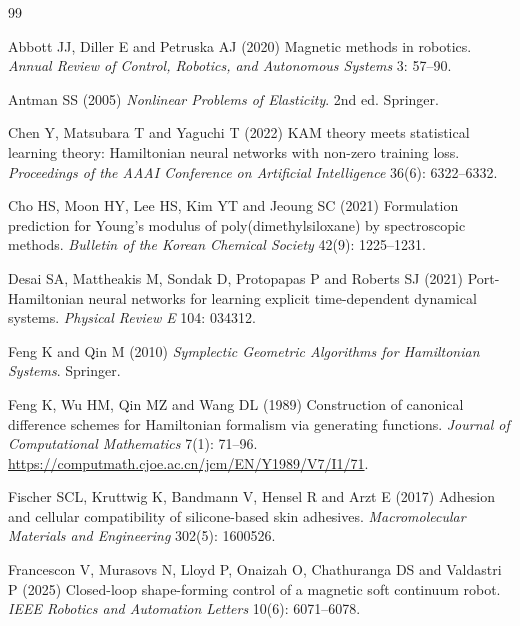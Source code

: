 \begin{thebibliography}{99}

Abbott JJ, Diller E and Petruska AJ (2020) Magnetic methods in robotics.
\textit{Annual Review of Control, Robotics, and Autonomous Systems} 3: 57--90.

Antman SS (2005) \textit{Nonlinear Problems of Elasticity}. 2nd ed. Springer.

Chen Y, Matsubara T and Yaguchi T (2022) KAM theory meets statistical learning theory:
Hamiltonian neural networks with non-zero training loss.
\textit{Proceedings of the AAAI Conference on Artificial Intelligence} 36(6): 6322--6332.

Cho HS, Moon HY, Lee HS, Kim YT and Jeoung SC (2021) Formulation prediction for Young's modulus of poly(dimethylsiloxane) by spectroscopic methods.
\textit{Bulletin of the Korean Chemical Society} 42(9): 1225--1231. 

Desai SA, Mattheakis M, Sondak D, Protopapas P and Roberts SJ (2021)
Port-Hamiltonian neural networks for learning explicit time-dependent dynamical systems.
\textit{Physical Review E} 104: 034312. 

Feng K and Qin M (2010) \textit{Symplectic Geometric Algorithms for Hamiltonian Systems}. Springer.

Feng K, Wu HM, Qin MZ and Wang DL (1989) Construction of canonical difference
schemes for Hamiltonian formalism via generating functions.
\textit{Journal of Computational Mathematics} 7(1): 71--96.
\url{https://computmath.cjoe.ac.cn/jcm/EN/Y1989/V7/I1/71}.

Fischer SCL, Kruttwig K, Bandmann V, Hensel R and Arzt E (2017) Adhesion and cellular compatibility of silicone-based skin adhesives.
\textit{Macromolecular Materials and Engineering} 302(5): 1600526. 

Francescon V, Murasovs N, Lloyd P, Onaizah O, Chathuranga DS and Valdastri P (2025)
Closed-loop shape-forming control of a magnetic soft continuum robot.
\textit{IEEE Robotics and Automation Letters} 10(6): 6071--6078.


\end{thebibliography}
